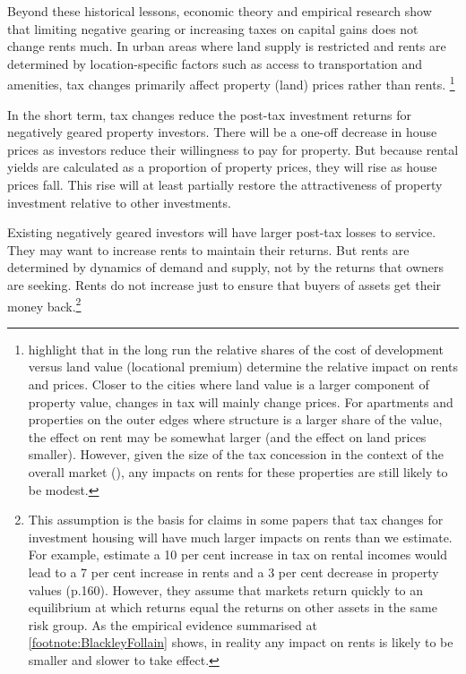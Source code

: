 \documentclass{grattanAlpha}\usepackage[]{graphicx}\usepackage[]{color}
\begin{document}
Beyond these historical lessons, economic theory and empirical research show that limiting negative gearing or increasing taxes on capital gains does not change rents much. In urban areas where land supply is restricted and rents are determined by location-specific factors such as access to transportation and amenities, tax changes primarily affect property (land) prices rather than rents.%
\footnote{\textcite{CapozzaGreenHendershott} \textcite{StapledonRoberts2016} highlight that in the long run the relative shares of the cost of development versus land value (locational premium) determine the relative impact on rents and prices. Closer to the cities where land value is a larger component of property value, changes in tax will mainly change prices. For apartments and properties on the outer edges where structure is a larger share of the value, the effect on rent may be somewhat larger (and the effect on land prices smaller). However, given the size of the tax concession in the context of the overall market (), any impacts on rents for these properties are still likely to be modest.} 

In the short term, tax changes reduce the post-tax investment returns for negatively geared property investors. There will be a one-off decrease in house prices as investors reduce their willingness to pay for property. But because rental yields are calculated as a proportion of property prices, they will rise as house prices fall. This rise will at least partially restore the attractiveness of property investment relative to other investments. 

Existing negatively geared investors will have larger post-tax losses to service. They may want to increase rents to maintain their returns. But rents are determined by dynamics of demand and supply, not by the returns that owners are seeking. Rents do not increase just to ensure that buyers of assets get their money back.\footnote{This assumption is the basis for claims in some papers that tax changes for investment housing will have much larger impacts on rents than we estimate. For example, \textcite{AbelsonJoyeux2007} estimate a 10 per cent increase in tax on rental incomes would lead to a 7 per cent increase in rents and a 3 per cent decrease in property values (p.160). However, they assume that markets return quickly to an equilibrium at which returns equal the returns on other assets in the same risk group. As the empirical evidence summarised at \cref{footnote:BlackleyFollain} shows, in reality any impact on rents is likely to be smaller and slower to take effect. } 
\end{document}

